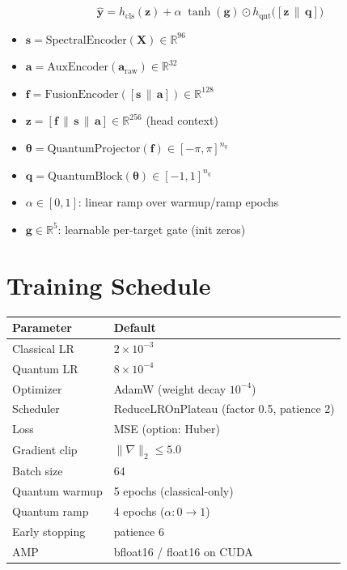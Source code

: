 \documentclass[11pt,a4paper]{article}
\begin{document}
\begin{equation}
\boxed{
\hat{\mathbf{y}} = h_{\mathrm{cls}}(\mathbf{z})
+ \alpha\;\tanh(\boldsymbol{g})\odot h_{\mathrm{qnt}}\!\bigl([\mathbf{z}\,\|\,\mathbf{q}]\bigr)
}
\end{equation}

\begin{itemize}
\item $\mathbf{s}=\text{SpectralEncoder}(\mathbf{X})\in\mathbb{R}^{96}$
\item $\mathbf{a}=\text{AuxEncoder}(\mathbf{a}_{\mathrm{raw}})\in\mathbb{R}^{32}$
\item $\mathbf{f}=\text{FusionEncoder}([\mathbf{s}\,\|\,\mathbf{a}])\in\mathbb{R}^{128}$
\item $\mathbf{z}=[\mathbf{f}\,\|\,\mathbf{s}\,\|\,\mathbf{a}]\in\mathbb{R}^{256}$ \quad (head context)
\item $\boldsymbol{\theta}=\text{QuantumProjector}(\mathbf{f})\in[-\pi,\pi]^{n_q}$
\item $\mathbf{q}=\text{QuantumBlock}(\boldsymbol{\theta})\in[-1,1]^{n_q}$
\item $\alpha\in[0,1]$: linear ramp over warmup/ramp epochs
\item $\boldsymbol{g}\in\mathbb{R}^5$: learnable per-target gate (init zeros)
\end{itemize}

\section{Training Schedule}

\begin{center}
\begin{tabular}{l l}
\toprule
\textbf{Parameter} & \textbf{Default} \\
\midrule
Classical LR & $2\times 10^{-3}$ \\
Quantum LR & $8\times 10^{-4}$ \\
Optimizer & AdamW (weight decay $10^{-4}$) \\
Scheduler & ReduceLROnPlateau (factor 0.5, patience 2) \\
Loss & MSE (option: Huber) \\
Gradient clip & $\|\nabla\|_2 \leq 5.0$ \\
Batch size & 64 \\
Quantum warmup & 5 epochs (classical-only) \\
Quantum ramp & 4 epochs ($\alpha: 0\to 1$) \\
Early stopping & patience 6 \\
AMP & bfloat16 / float16 on CUDA \\
\bottomrule
\end{tabular}
\end{center}
\end{document}
